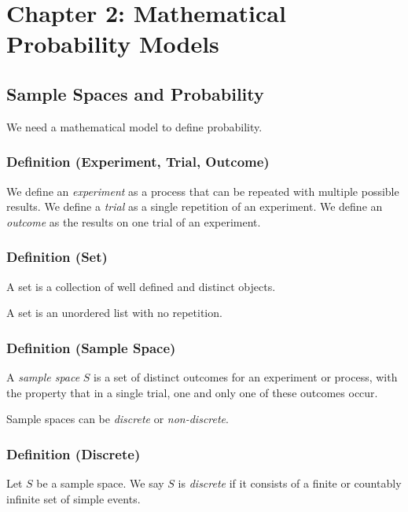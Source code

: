 \chapter{Chapter 2: Mathematical Probability Models}
\section{Sample Spaces and Probability}

We need a mathematical model to define probability.

\begin{defbox}
    \subsection{Definition (Experiment, Trial, Outcome)}
    We define an \emph{experiment} as a process that can be repeated with
    multiple possible results. We define a \emph{trial} as a single
    repetition of an experiment. We define an \emph{outcome} as
    the results on one trial of an experiment.
\end{defbox}

\begin{defbox}
    \subsection{Definition (Set)}
    A set is a collection of well defined and distinct objects.
\end{defbox}
\begin{remark}
    A set is an unordered list with no repetition.
\end{remark}

\begin{defbox}
    \subsection{Definition (Sample Space)}
    A \emph{sample space} $ S $ is a set of distinct outcomes for an experiment
    or process, with the property that in a single trial, one and only one of
    these outcomes occur.
\end{defbox}

Sample spaces can be \emph{discrete} or \emph{non-discrete}.
\begin{defbox}
    \subsection{Definition (Discrete)}
    Let $ S $ be a sample space. We say $ S $ is \emph{discrete} if it consists
    of a finite or countably infinite set of simple events.
\end{defbox}


